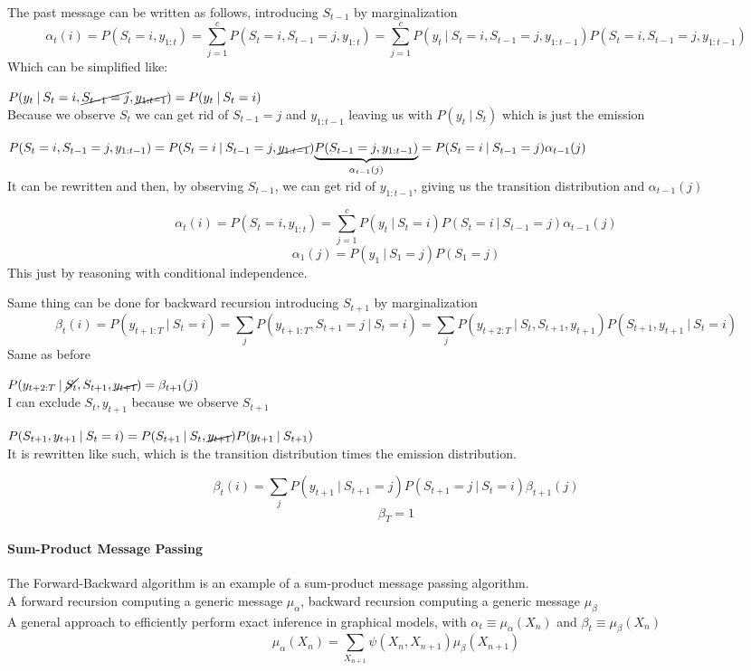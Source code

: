 \documentclass[10pt]{report}
\begin{document}
The past message can be written as follows, introducing $S_{t-1}$ by marginalization
$$\alpha_t(i) = P(S_t = i,y_{1:t}) = \sum_{j=1}^c P(S_t = i, S_{t-1}=j,y_{1:t}) = \sum_{j=1}^c P(y_t\:|\:S_t = i, S_{t-1} = j, y_{1:t-1})P(S_t = i,S_{t-1} = j,y_{1:t-1})$$
Which can be simplified like:
\begin{list}{}{}
	\item $P(y_t\:|\:S_t = i, \cancel{S_{t-1} = j}, \cancel{y_{1:t-1}}) = P(y_t\:|\:S_t=i)$\\
	Because we observe $S_t$ we can get rid of $S_{t-1}=j$ and $y_{1:t-1}$ leaving us with $P(y_t\:|\:S_t)$ which is just the emission
	\item $P(S_t = i,S_{t-1} = j,y_{1:t-1}) = P(S_t = i\:|\:S_{t-1}=j,\cancel{y_{1:t-1}}) \underset{\alpha_{t-1}(j)}{\underbrace{P (S_{t-1}=j, y_{1:t-1})}} = P(S_t = i\:|\:S_{t-1}=j)\alpha_{t-1}(j)$\\
	It can be rewritten and then, by observing $S_{t-1}$, we can get rid of $y_{1:t-1}$, giving us the transition distribution and $\alpha_{t-1}(j)$
\end{list}
$$\alpha_t(i) = P(S_t=i,y_{1:t}) = \sum_{j=1}^c P(y_t\:|\:S_t=i) P(S_t=i\:|\:S_{t-1}=j)\alpha_{t-1}(j)$$
$$\alpha_1(j) = P(y_1\:|\:S_1=j)P(S_1=j)$$
This just by reasoning with conditional independence.
\pagebreak

Same thing can be done for backward recursion introducing $S_{t+1}$ by marginalization $$\beta_t(i) = P(y_{t+1:T}\:|\:S_{t} = i) = \sum_j P(y_{t+1:T},S_{t+1}=j\:|\:S_t=i) = \sum_j P(y_{t+2:T}\:|\:S_t, S_{t+1},y_{t+1})P(S_{t+1},y_{t+1}\:|\:S_t=i)$$
Same as before
\begin{list}{}{}
	\item $P(y_{t+2:T}\:|\:\cancel{S_t}, S_{t+1},\cancel{y_{t+1}}) = \beta_{t+1}(j)$\\
	I can exclude $S_t, y_{t+1}$ because we observe $S_{t+1}$
	\item $P(S_{t+1},y_{t+1}\:|\:S_t=i) = P(S_{t+1}\:|\:S_t,\cancel{y_{t+1}})P(y_{t+1}\:|\:S_{t+1})$\\
	It is rewritten like such, which is the transition distribution times the emission distribution.
\end{list}
$$\beta_t(i) = \sum_j P(y_{t+1}\:|\:S_{t+1} = j)P(S_{t+1}=j\:|\:S_t=i)\beta_{t+1}(j)$$
$$\beta_T = 1$$
\paragraph{Sum-Product Message Passing} The Forward-Backward algorithm is an example of a sum-product message passing algorithm.\\
A forward recursion computing a generic message $\mu_\alpha$, backward recursion computing a generic message $\mu_\beta$\\
A general approach to efficiently perform exact inference in graphical models, with $\alpha_t \equiv \mu_\alpha(X_n)$ and $\beta_{t}\equiv \mu_\beta(X_n)$
$$\mu_\alpha(X_n) = \sum_{X_{n+1}} \psi(X_n, X_{n+1})\mu_\beta(X_{n+1})$$
\end{document}
